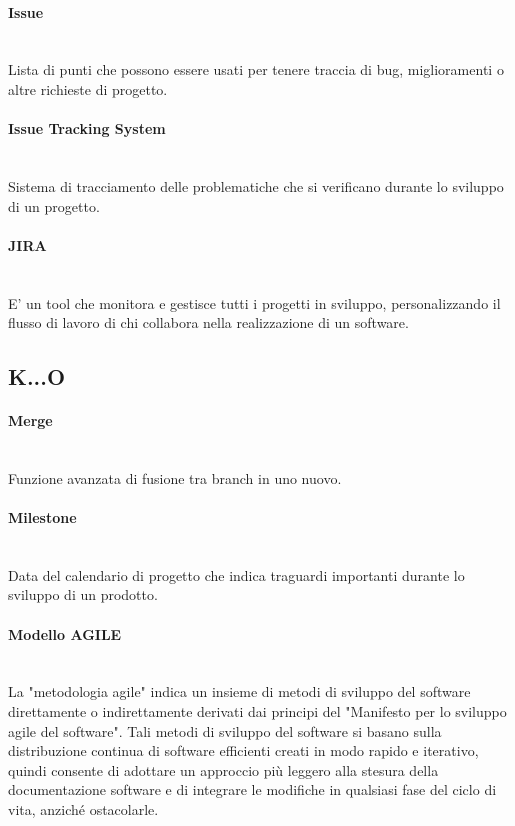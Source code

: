 \paragraph{Issue}~\smallskip \\
Lista di punti che possono essere usati per tenere traccia di bug, miglioramenti o altre richieste di progetto.

\paragraph{Issue Tracking System}~\smallskip \\
Sistema di tracciamento delle problematiche che si verificano durante lo sviluppo di un progetto.

\paragraph{JIRA}~\smallskip \\
E' un tool che monitora e gestisce tutti i progetti in sviluppo, personalizzando il flusso di lavoro di chi collabora nella realizzazione di un software.

\subsection{K...O}

\paragraph{Merge}~\smallskip \\
Funzione avanzata di fusione tra branch in uno nuovo.

\paragraph{Milestone}~\smallskip \\
Data del calendario di progetto che indica traguardi importanti durante lo sviluppo di un prodotto.

\paragraph{Modello AGILE}~\smallskip \\
La "metodologia agile" indica un insieme di metodi di sviluppo del software direttamente o indirettamente derivati dai principi del "Manifesto per lo sviluppo agile del software".
Tali metodi di sviluppo del software si basano sulla distribuzione continua di software efficienti creati in modo rapido e iterativo, quindi
consente di adottare un approccio più leggero alla stesura della documentazione software e di integrare le modifiche in qualsiasi fase del ciclo di vita, anziché ostacolarle.

